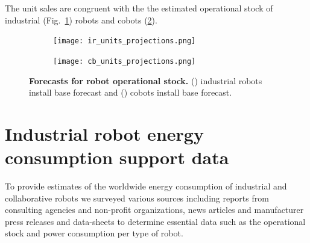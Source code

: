 The unit sales are congruent with the the estimated operational stock of industrial (Fig.~\ref{fig:ir_stock}) robots and cobots (\ref{fig:cobot_stock}).
\begin{figure}[t!]
	\centering
	\hspace*{\fill}
	\begin{subfigure}[t]{0.45\textwidth}
		\subcaption{}
		\texttt{[image: ir\_units\_projections.png]}
		\label{fig:ir_stock}
	\end{subfigure}
	\hfill
	\begin{subfigure}[t]{0.45\textwidth}
		\subcaption{}
		\texttt{[image: cb\_units\_projections.png]}
		\label{fig:cobot_stock}
	\end{subfigure}
	\hspace*{\fill}	
	\caption[] {\label{fig:robot_forecasts} \textbf{Forecasts for robot operational stock.} () industrial robots install base forecast and () cobots install base forecast.}	
\end{figure}
\newpage
\section{Industrial robot energy consumption support data}\label{sec:app_robot_ener_consumption}
To provide estimates of the worldwide energy consumption of industrial and collaborative robots we surveyed various sources including reports from consulting agencies and non-profit organizations, news articles and manufacturer press releases and data-sheets to determine essential data such as the operational stock and power consumption per type of robot.

